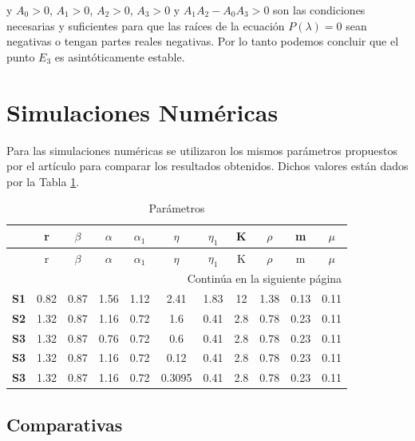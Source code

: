 \documentclass{wscpaperproc}
\theoremstyle{wsc}
\begin{document}
y $A_0 > 0$, $A_1 > 0$, $A_2 > 0$, $A_3 > 0$ y $A_1 A_2 - A_0 A_3 > 0$ son las condiciones necesarias y suficientes
para que las raíces de la ecuación $P(\lambda) = 0$ sean negativas o tengan partes reales negativas. Por lo tanto podemos 
concluir que el punto $E_3$ es asint\'oticamente estable.
\section{Simulaciones Numéricas}
Para las simulaciones numéricas se utilizaron los mismos parámetros propuestos por el artículo para comparar los resultados obtenidos.
Dichos valores están dados por la Tabla \ref{tab:first}.


\begin{longtable}{rcccccccccc}
	\caption{Par\'ametros\label{tab:first}}                                                                \\
	\hline
	            & r    & $\beta$ & $\alpha$ & $\alpha_1$ & $\eta$ & $\eta_1$ & K   & $\rho$ & m    & $\mu$ \\ \hline
	\endfirsthead
	\hline
	            & r    & $\beta$ & $\alpha$ & $\alpha_1$ & $\eta$ & $\eta_1$ & K   & $\rho$ & m    & $\mu$ \\ \hline
	\endhead
	\hline
	\multicolumn{11}{|r|}{{Continúa en la siguiente página}}                                               \\ \hline
	\endfoot
	\hline
	\endlastfoot
	\textbf{S1} & 0.82 & 0.87    & 1.56     & 1.12       & 2.41   & 1.83     & 12  & 1.38   & 0.13 & 0.11  \\
	\textbf{S2} & 1.32 & 0.87    & 1.16     & 0.72       & 1.6    & 0.41     & 2.8 & 0.78   & 0.23 & 0.11  \\
	\textbf{S3} & 1.32 & 0.87    & 0.76     & 0.72       & 0.6    & 0.41     & 2.8 & 0.78   & 0.23 & 0.11  \\
	\textbf{S3} & 1.32 & 0.87    & 1.16     & 0.72       & 0.12   & 0.41     & 2.8 & 0.78   & 0.23 & 0.11  \\
	\textbf{S3} & 1.32 & 0.87    & 1.16     & 0.72       & 0.3095 & 0.41     & 2.8 & 0.78   & 0.23 & 0.11  \\
\end{longtable}

\subsection{Comparativas}
\end{document}
